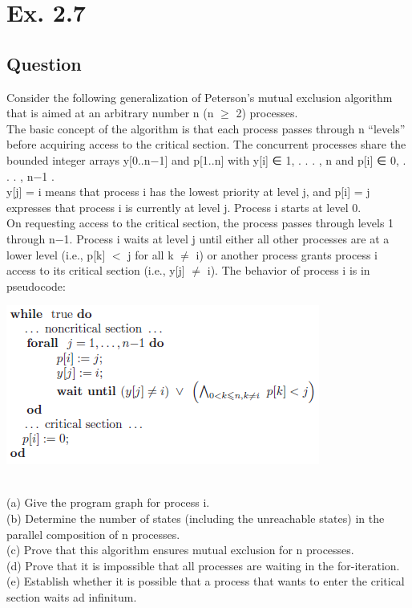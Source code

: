 \documentclass[12pt]{article}
\begin{document}
\newpage
\section*{Ex. 2.7}
\subsection*{Question}
Consider the following generalization of Peterson’s mutual exclusion algorithm
that is aimed at an arbitrary number n (n $\geq$ 2) processes.\\
The basic concept of the algorithm is that each process passes through n “levels” before acquiring access to the critical section. The concurrent processes share the bounded integer arrays y[0..n−1] and p[1..n] with y[i] ∈ {1, . . . , n } and p[i] ∈ {0, . . . , n−1 }. \\
y[j] = i means that process i has the lowest priority at level j, and p[i] = j expresses that process i is currently at level j. Process i starts at level 0. \\
On requesting access to the critical section, the process passes through levels 1 through n−1. Process i waits at
level j until either all other processes are at a lower level (i.e., p[k] $<$ j for all k $\neq$ i) or another
process grants process i access to its critical section (i.e., y[j] $\neq$ i). The behavior of process i is in
pseudocode:\\
\begin{centering}
	\includegraphics*[scale=0.8]{ex27.png}
\end{centering}\\
(a) Give the program graph for process i.\\
(b) Determine the number of states (including the unreachable states) in the parallel composition
of n processes.\\
(c) Prove that this algorithm ensures mutual exclusion for n processes.\\
(d) Prove that it is impossible that all processes are waiting in the for-iteration.\\
(e) Establish whether it is possible that a process that wants to enter the critical section waits
ad infinitum.\\
\end{document}
